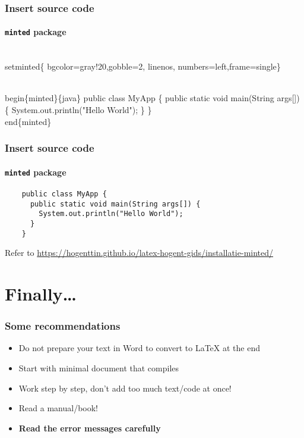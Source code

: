 \documentclass[aspectratio=169]{beamer}
\begin{document}
\begin{frame}[fragile]
 \frametitle{Insert source code}
  \framesubtitle{\texttt{minted} package}

  \begin{semiverbatim}
  \\setminted\{%
    bgcolor=gray!20,gobble=2, linenos,
    numbers=left,frame=single\}

  \\begin\{minted\}\{java\}
    public class MyApp \{
      public static void main(String args[]) \{
        System.out.println("Hello World");
      \}
    \}
  \\end\{minted\}
  \end{semiverbatim}
\end{frame}

\begin{frame}[fragile]
 \frametitle{Insert source code}
  \framesubtitle{\texttt{minted} package}
  \begin{verbatim}
    public class MyApp {
      public static void main(String args[]) {
        System.out.println("Hello World");
      }
    }
  \end{verbatim}
  
  \bigskip
  
  Refer to \url{https://hogenttin.github.io/latex-hogent-gids/installatie-minted/}
  
\end{frame}

\section{Finally\ldots}

\begin{frame}
  \frametitle{Some recommendations}

  \begin{itemize}
   \item Do not prepare your text in Word to convert to {\LaTeX} at the end
   \item Start with minimal document that compiles
   \item Work step by step, don't add too much text/code at once!
   \item Read a manual/book!
   \item \textbf{Read the error messages carefully}
  \end{itemize}

\end{frame}
\end{document}
